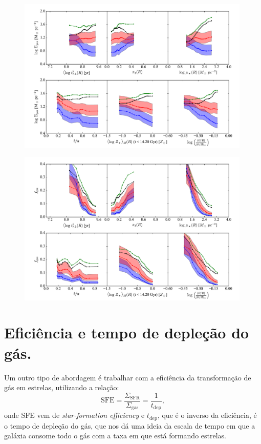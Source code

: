 \begin{figure}
	\centering
	\includegraphics[width=0.99\textwidth]{figuras/props_SigmaGas.pdf}
	\caption[Propriedades versos $\SigmaGas$.]
	{}
	\label{fig:propsSigmaGas}
\end{figure}
\begin{figure}
	\centering
	\includegraphics[width=0.99\textwidth]{figuras/props_fGas.pdf}
	\caption[Propriedades versos $f_{\mathrm{gas}}$.]
	{}
	\label{fig:propsfGas}
\end{figure}


\section{Eficiência e tempo de depleção do gás.}
\label{sec:gasfrac:SFE}

Um outro tipo de abordagem é trabalhar com a eficiência da transformação de gás em estrelas,
utilizando a relação:
\begin{equation}
	\mathrm{SFE} = \frac{\Sigma_{\mathrm{SFR}}}{\Sigma_{\mathrm{gas}}} = \frac{1}{t_{\mathrm{dep}}},
	\label{eq:SFE}
\end{equation}
\noindent onde SFE vem de {\em star-formation efficiency} e $t_{\mathrm{dep}}$, que é o inverso da
eficiência, é o tempo de depleção do gás, que nos dá uma ideia da escala de tempo em que a galáxia
consome todo o gás com a taxa em que está formando estrelas.

